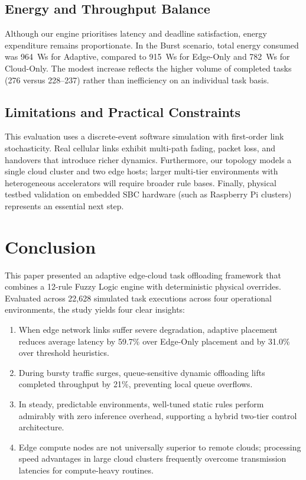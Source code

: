 \documentclass[conference]{IEEEtran}
\begin{document}
\subsection{Energy and Throughput Balance}
Although our engine prioritises latency and deadline satisfaction, energy expenditure remains proportionate. In the Burst scenario, total energy consumed was 964~Ws for Adaptive, compared to 915~Ws for Edge-Only and 782~Ws for Cloud-Only. The modest increase reflects the higher volume of completed tasks (276 versus 228--237) rather than inefficiency on an individual task basis.

\subsection{Limitations and Practical Constraints}
This evaluation uses a discrete-event software simulation with first-order link stochasticity. Real cellular links exhibit multi-path fading, packet loss, and handovers that introduce richer dynamics. Furthermore, our topology models a single cloud cluster and two edge hosts; larger multi-tier environments with heterogeneous accelerators will require broader rule bases. Finally, physical testbed validation on embedded SBC hardware (such as Raspberry Pi clusters) represents an essential next step.

\section{Conclusion}
\label{sec:conclusion}

This paper presented an adaptive edge-cloud task offloading framework that combines a 12-rule Fuzzy Logic engine with deterministic physical overrides. Evaluated across 22{,}628 simulated task executions across four operational environments, the study yields four clear insights:
\begin{enumerate}
  \item When edge network links suffer severe degradation, adaptive placement reduces average latency by 59.7\% over Edge-Only placement and by 31.0\% over threshold heuristics.
  \item During bursty traffic surges, queue-sensitive dynamic offloading lifts completed throughput by 21\%, preventing local queue overflows.
  \item In steady, predictable environments, well-tuned static rules perform admirably with zero inference overhead, supporting a hybrid two-tier control architecture.
  \item Edge compute nodes are not universally superior to remote clouds; processing speed advantages in large cloud clusters frequently overcome transmission latencies for compute-heavy routines.
\end{enumerate}
\end{document}
